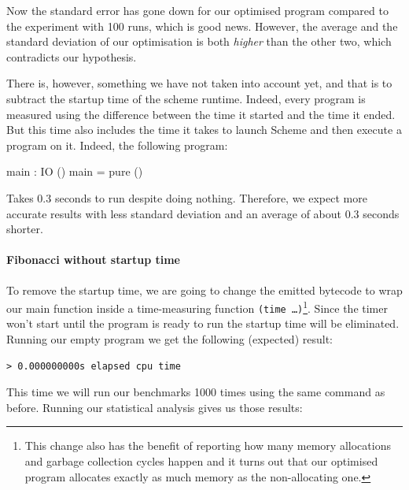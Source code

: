\documentclass[
]{article}
\newenvironment{Shaded}{}{}
\newcommand{\DataTypeTok}[1]{\textcolor[rgb]{0.56,0.13,0.00}{#1}}
\newcommand{\FunctionTok}[1]{\textcolor[rgb]{0.02,0.16,0.49}{#1}}
\newcommand{\NormalTok}[1]{#1}
\newcommand{\OperatorTok}[1]{\textcolor[rgb]{0.40,0.40,0.40}{#1}}
\newcommand{\OtherTok}[1]{\textcolor[rgb]{0.00,0.44,0.13}{#1}}
\begin{document}
Now the standard error has gone down for our optimised program compared
to the experiment with 100 runs, which is good news. However, the
average and the standard deviation of our optimisation is both
\emph{higher} than the other two, which contradicts our hypothesis.

There is, however, something we have not taken into account yet, and
that is to subtract the startup time of the scheme runtime. Indeed,
every program is measured using the difference between the time it
started and the time it ended. But this time also includes the time it
takes to launch Scheme and then execute a program on it. Indeed, the
following program:

\begin{Shaded}
\begin{Highlighting}[]
\NormalTok{main }\OperatorTok{:} \DataTypeTok{IO}\NormalTok{ ()}
\NormalTok{main }\OtherTok{=} \FunctionTok{pure}\NormalTok{ ()}
\end{Highlighting}
\end{Shaded}

Takes 0.3 seconds to run despite doing nothing. Therefore, we expect
more accurate results with less standard deviation and an average of
about 0.3 seconds shorter.

\hypertarget{fibonacci-without-startup-time}{%
\paragraph{Fibonacci without startup
time}\label{fibonacci-without-startup-time}}

To remove the startup time, we are going to change the emitted bytecode
to wrap our main function inside a time-measuring function
\texttt{(time\ \ldots{})}\footnote{This change also has the benefit of
  reporting how many memory allocations and garbage collection cycles
  happen and it turns out that our optimised program allocates exactly
  as much memory as the non-allocating one.}. Since the timer won't
start until the program is ready to run the startup time will be
eliminated. Running our empty program we get the following (expected)
result:

\begin{verbatim}
> 0.000000000s elapsed cpu time
\end{verbatim}

This time we will run our benchmarks 1000 times using the same command
as before. Running our statistical analysis gives us those results:
\end{document}
